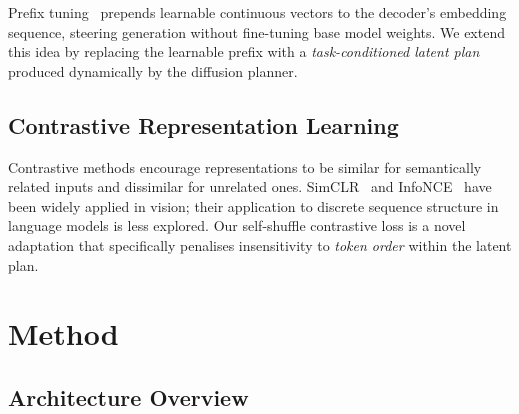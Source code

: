 \documentclass[11pt]{article}
\begin{document}
Prefix tuning~\citep{li2021prefix} prepends learnable continuous vectors to
the decoder's embedding sequence, steering generation without fine-tuning base
model weights.
We extend this idea by replacing the learnable prefix with a
\emph{task-conditioned latent plan} produced dynamically by the diffusion planner.

\subsection{Contrastive Representation Learning}

Contrastive methods encourage representations to be similar for semantically
related inputs and dissimilar for unrelated ones.
SimCLR~\citep{chen2020simple} and InfoNCE~\citep{oord2018representation}
have been widely applied in vision; their application to discrete sequence
structure in language models is less explored.
Our self-shuffle contrastive loss is a novel adaptation that specifically
penalises insensitivity to \emph{token order} within the latent plan.

\section{Method}
\label{sec:method}

\subsection{Architecture Overview}
\label{sec:arch}
\end{document}
